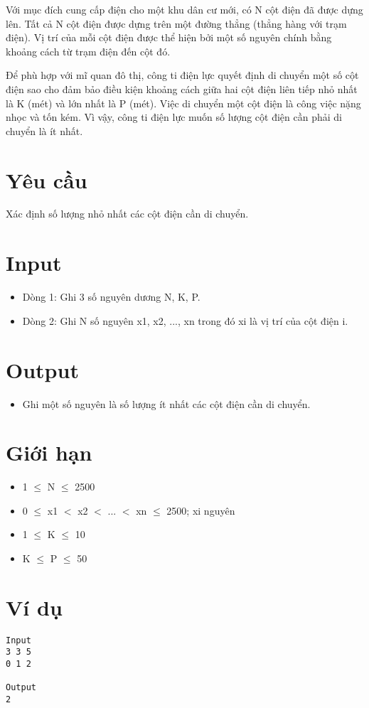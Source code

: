 



   Với mục đích cung cấp điện cho một khu dân cư mới, có N cột điện đã được dựng lên. Tất cả N cột điện được dựng trên một đường thẳng (thẳng hàng với trạm điện). Vị trí của mỗi cột điện được thể hiện bởi một số nguyên chính bằng khoảng cách từ trạm điện đến cột đó.  

   Để phù hợp với mĩ quan đô thị, công ti điện lực quyết định di chuyển một số cột điện sao cho đảm bảo điều kiện khoảng cách giữa hai cột điện liên tiếp nhỏ nhất là K (mét) và lớn nhất là P (mét). Việc di chuyển một cột điện là công việc nặng nhọc và tốn kém. Vì vậy, công ti điện lực muốn số lượng cột điện cần phải di chuyển là ít nhất.  

\section{   Yêu cầu  }

   Xác định số lượng nhỏ nhất các cột điện cần di chuyển.  

\section{   Input  }
\begin{itemize}
	\item     Dòng 1: Ghi 3 số nguyên dương N, K, P.   
	\item     Dòng 2: Ghi N số nguyên x1, x2, ..., xn trong đó xi là vị trí của cột điện i.   
\end{itemize}

\section{   Output  }
\begin{itemize}
	\item     Ghi một số nguyên là số lượng ít nhất các cột điện cần di chuyển.   
\end{itemize}

\section{   Giới hạn  }
\begin{itemize}
	\item     1  $\le$  N  $\le$  2500   
	\item     0  $\le$  x1 $<$ x2 $<$ ... $<$ xn  $\le$  2500; xi nguyên   
	\item     1  $\le$  K  $\le$  10   
	\item     K  $\le$  P  $\le$  50   
\end{itemize}

\section{   Ví dụ  }
\begin{verbatim}
Input
3 3 5
0 1 2

Output
2
\end{verbatim}
